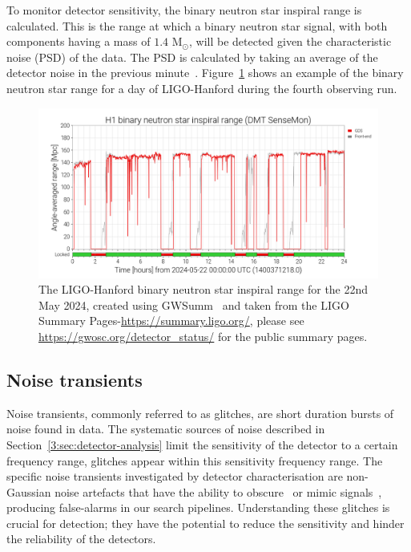 To monitor detector sensitivity, the binary neutron star inspiral range is calculated. This is the range at which a binary neutron star signal, with both components having a mass of $1.4$ M$_{\odot}$, will be detected given the characteristic noise (PSD) of the data. The PSD is calculated by taking an average of the detector noise in the previous minute~\cite{range_calculation:2003, ota:2023}. Figure~\ref{3:fig:bns_range} shows an example of the binary neutron star range for a day of LIGO-Hanford during the fourth observing run.
%
\begin{figure}
    \centering
    \includegraphics[width=1\linewidth]{images/3_detector_characterisation/may22_bns_range.png}
    \caption{The LIGO-Hanford binary neutron star inspiral range for the 22nd May 2024, created using GWSumm~\cite{gwsumm:2024} and taken from the LIGO Summary Pages-\href{https://summary.ligo.org/}{https://summary.ligo.org/}, please see \href{https://gwosc.org/detector_status/}{https://gwosc.org/detector\_status/} for the public summary pages.}
    \label{3:fig:bns_range}
\end{figure}
%

\subsection{\label{3:sec:noise-transients}Noise transients}


Noise transients, commonly referred to as glitches, are short duration bursts of noise found in \gwadj data. The systematic sources of noise described in Section~\ref{3:sec:detector-analysis} limit the sensitivity of the detector to a certain frequency range, glitches appear within this sensitivity frequency range. The specific noise transients investigated by detector characterisation are non-Gaussian noise artefacts that have the ability to obscure~\cite{GW170817:2017} or mimic \gwadj signals~\cite{GWMimicking:2010}, producing false-alarms in our \gwadj search pipelines. Understanding these glitches is crucial for \gwadj detection; they have the potential to reduce the sensitivity and hinder the reliability of the detectors.
%
%


